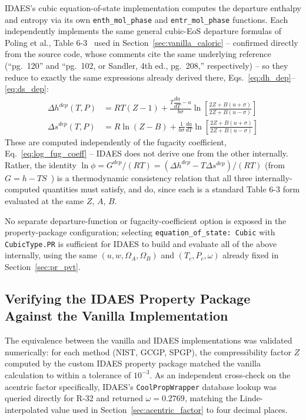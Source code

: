 \documentclass{article}
\begin{document}
IDAES's cubic equation-of-state implementation computes the departure
enthalpy and entropy via its own \texttt{enth\_mol\_phase} and
\texttt{entr\_mol\_phase} functions. Each independently implements the same
general cubic-EoS departure formulas of Poling et al., Table
6-3~\cite{poling2001} used in Section~\ref{sec:vanilla_caloric} --
confirmed directly from the source code, whose comments cite the same
underlying reference (``pg.\ 120'' and ``pg.\ 102, or Sandler, 4th ed.,
pg.\ 208,'' respectively) -- so they reduce to exactly the same
expressions already derived there, Eqs.~\eqref{eq:dh_dep}--\eqref{eq:ds_dep}:
\begin{subequations}
\begin{align}
    \Delta h^{dep}(T,P) &= RT(Z-1) + \frac{T\dfrac{da}{dT} - a}{b\sigma}\ln\left[\frac{2Z+B(u+\sigma)}{2Z+B(u-\sigma)}\right] \\
    \Delta s^{dep}(T,P) &= R\ln(Z-B) + \frac{1}{b\sigma}\frac{da}{dT}\ln\left[\frac{2Z+B(u+\sigma)}{2Z+B(u-\sigma)}\right]
\end{align}
\end{subequations}
These are computed independently of the fugacity coefficient,
Eq.~\eqref{eq:log_fug_coeff} -- IDAES does not derive one from the other
internally. Rather, the identity $\ln\phi = G^{dep}/(RT) =
(\Delta h^{dep}-T\Delta s^{dep})/(RT)$ (from $G=h-TS$~\cite{smithvanness2018})
is a thermodynamic consistency relation that all three internally-computed
quantities must satisfy, and do, since each is a standard Table 6-3 form
evaluated at the same $Z$, $A$, $B$.

No separate departure-function or fugacity-coefficient option is exposed in
the property-package configuration; selecting \texttt{equation\_of\_state: Cubic}
with \texttt{CubicType.PR} is sufficient for IDAES to build and evaluate all of the
above internally, using the same $(u,w,\Omega_A,\Omega_B)$ and $(T_c,P_c,\omega)$
already fixed in Section~\ref{sec:pr_pvt}.

\subsection{Verifying the IDAES Property Package Against the Vanilla Implementation}\label{sec:idaes_verification}
The equivalence between the vanilla and IDAES implementations was validated
numerically: for each method (NIST, GCGP, SPGP), the compressibility factor
$Z$ computed by the custom IDAES property package matched the vanilla
calculation to within a tolerance of $10^{-3}$. As an independent
cross-check on the acentric factor specifically, IDAES's
\texttt{CoolPropWrapper} database lookup was queried directly for R-32 and
returned $\omega=0.2769$, matching the Linde-interpolated value used in
Section~\ref{sec:acentric_factor} to four decimal places.
\end{document}
